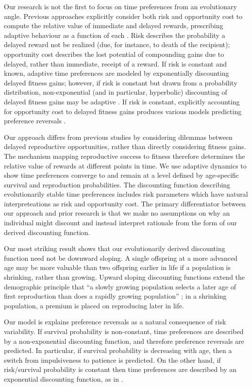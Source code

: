 \documentclass[titlepage, hidelinks, 12pt]{article}
\theoremstyle{plain}
\theoremstyle{remark}
\theoremstyle{definition}
\begin{document}
Our research is not the first to focus on time preferences from an evolutionary angle. Previous approaches explicitly consider both
risk and opportunity cost to compute the relative value of immediate and delayed rewards, prescribing adaptive behaviour as a function of
each \cite{sozou98, fawcett12}. Risk describes the probability a delayed reward not be realized (due, for instance, to death
of the recipient); opportunity cost 
describes the lost potential of compounding gains due to delayed, rather than immediate, receipt of a reward. 
If risk is constant and known, 
adaptive time preferences are modeled by exponentially discounting delayed fitness gains; however, if risk is constant but drawn
from a probability distribution, non-exponential (and in particular, hyperbolic) discounting of delayed fitness gains may be adaptive \cite{sozou98}. 
If risk is constant, explicitly accounting for opportunity
cost to delayed fitness gains produces various models predicting preference reversals \cite{fawcett12}. 

Our approach differs from previous studies by considering dilemmas between delayed reproductive opportunities, 
rather than directly considering fitness gains. 
The mechanism mapping reproductive success to fitness therefore determines the relative value of rewards at different points in time. 
We use adaptive dynamics to show time preferences converge to and remain at a level defined by age-specific survival and reproduction probabilities. 
The discounting function describing evolutionarily stable time preferences includes risk parameters which have natural interpreteations
as risk and opportunity cost. The primary differentiator between our approach and prior research is that we make no assumptions on why
an individual might discount and instead interpret rationale from the form of our derived discounting function.  

Our most striking result shows that our evolutionarily derived discounting function need not be downward sloping. 
A single offspring at a more advanced age
may be more valuable than two offspring earlier in life if a population is shrinking, rather than growing.
Upward sloping discounting functions extend the demographic principle that
``a slowly growing population selects a later age of first reproduction than does a rapidly growing population'' \cite{bull04};
in a shrinking population, a premium is placed on reproducing later in life. 

Our model is explains preference reversals as a natural consequence of risk variability. If survival probability is non-constant, 
time preferences are described by a non-exponential discounting function, and therefore preference reversals are predicted. In 
particular, if survival probability is decreasing with age, then a switch from impulsiveness to patience is predicted. On the other
hand, if risk/survival probability is constant then time preferences are described by an exponential discounting function, as in \cite{sozou98}. 
\end{document}
